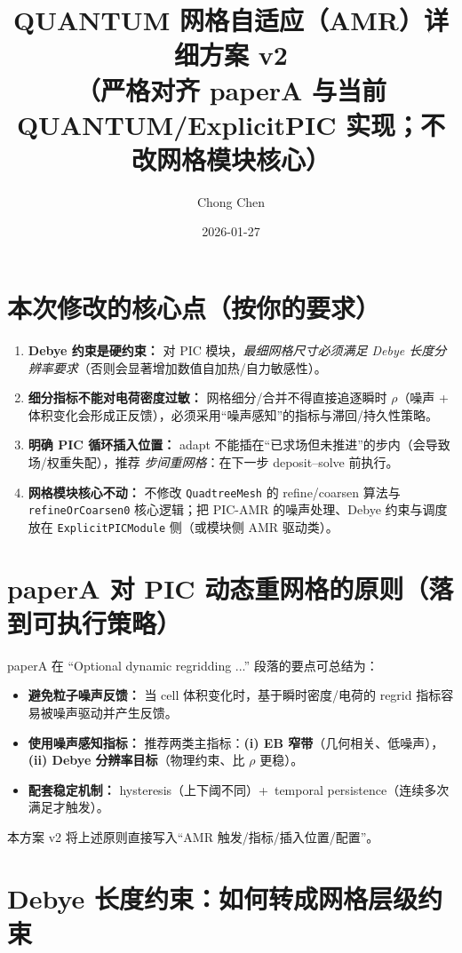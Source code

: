 \documentclass[UTF8,11pt,a4paper]{ctexart}
\title{QUANTUM 网格自适应（AMR）详细方案 v2\\\large（严格对齐 paperA 与当前 QUANTUM/ExplicitPIC 实现；不改网格模块核心）}
\author{Chong Chen}
\date{2026-01-27}
\begin{document}
\sloppy
\setlength{\emergencystretch}{2em}
\maketitle

\section{本次修改的核心点（按你的要求）}
\begin{enumerate}[leftmargin=1.6em]
  \item \textbf{Debye 约束是硬约束：} 对 PIC 模块，\emph{最细网格尺寸必须满足 Debye 长度分辨率要求}（否则会显著增加数值自加热/自力敏感性）。
  \item \textbf{细分指标不能对电荷密度过敏：} 网格细分/合并不得直接追逐瞬时 $\rho$（噪声 + 体积变化会形成正反馈），必须采用“噪声感知”的指标与滞回/持久性策略。
  \item \textbf{明确 PIC 循环插入位置：} adapt 不能插在“已求场但未推进”的步内（会导致场/权重失配），推荐 \emph{步间重网格}：在下一步 deposit--solve 前执行。
  \item \textbf{网格模块核心不动：} 不修改 \texttt{QuadtreeMesh} 的 refine/coarsen 算法与 \texttt{refineOrCoarsen0} 核心逻辑；把 PIC-AMR 的噪声处理、Debye 约束与调度放在 \texttt{ExplicitPICModule} 侧（或模块侧 AMR 驱动类）。
\end{enumerate}

\section{paperA 对 PIC 动态重网格的原则（落到可执行策略）}
paperA 在 “Optional dynamic regridding ...” 段落的要点可总结为：
\begin{itemize}[leftmargin=1.6em]
  \item \textbf{避免粒子噪声反馈：} 当 cell 体积变化时，基于瞬时密度/电荷的 regrid 指标容易被噪声驱动并产生反馈。
  \item \textbf{使用噪声感知指标：} 推荐两类主指标：\textbf{(i) EB 窄带}（几何相关、低噪声），\textbf{(ii) Debye 分辨率目标}（物理约束、比 $\rho$ 更稳）。
  \item \textbf{配套稳定机制：} hysteresis（上下阈不同）+\ temporal persistence（连续多次满足才触发）。
\end{itemize}
本方案 v2 将上述原则直接写入“AMR 触发/指标/插入位置/配置”。

\section{Debye 长度约束：如何转成网格层级约束}
\end{document}
